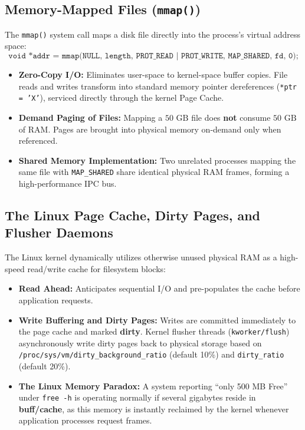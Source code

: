 \subsection{Memory-Mapped Files (\texttt{mmap()})}
The \texttt{mmap()} system call maps a disk file directly into the process's virtual address space:
\begin{equation}
\texttt{void *addr = mmap(NULL, length, PROT\_READ | PROT\_WRITE, MAP\_SHARED, fd, 0);}
\end{equation}
\begin{itemize}
    \item \textbf{Zero-Copy I/O:} Eliminates user-space to kernel-space buffer copies. File reads and writes transform into standard memory pointer dereferences (\texttt{*ptr = 'X'}), serviced directly through the kernel Page Cache.
    \item \textbf{Demand Paging of Files:} Mapping a $50\text{ GB}$ file does \textbf{not} consume $50\text{ GB}$ of RAM. Pages are brought into physical memory on-demand only when referenced.
    \item \textbf{Shared Memory Implementation:} Two unrelated processes mapping the same file with \texttt{MAP\_SHARED} share identical physical RAM frames, forming a high-performance IPC bus.
\end{itemize}

\subsection{The Linux Page Cache, Dirty Pages, and Flusher Daemons}
The Linux kernel dynamically utilizes otherwise unused physical RAM as a high-speed read/write cache for filesystem blocks:
\begin{itemize}
    \item \textbf{Read Ahead:} Anticipates sequential I/O and pre-populates the cache before application requests.
    \item \textbf{Write Buffering and Dirty Pages:} Writes are committed immediately to the page cache and marked \textbf{dirty}. Kernel flusher threads (\texttt{kworker/flush}) asynchronously write dirty pages back to physical storage based on \texttt{/proc/sys/vm/dirty\_background\_ratio} (default 10\%) and \texttt{dirty\_ratio} (default 20\%).
    \item \textbf{The Linux Memory Paradox:} A system reporting ``only 500 MB Free'' under \texttt{free -h} is operating normally if several gigabytes reside in \textbf{buff/cache}, as this memory is instantly reclaimed by the kernel whenever application processes request frames.
\end{itemize}

